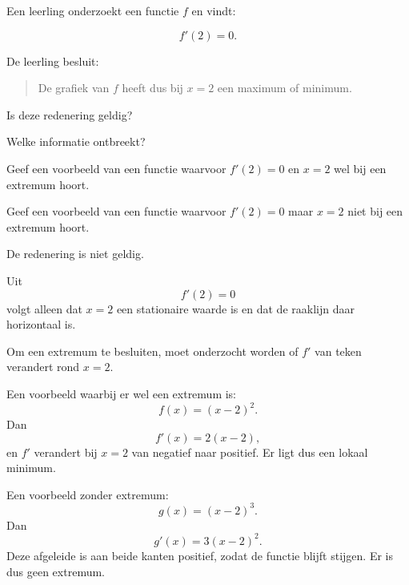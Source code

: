 \documentclass{ximera}
\begin{document}
\begin{oefening}{\oefU\ESS}

Een leerling onderzoekt een functie $f$ en vindt:

\[
f'(2)=0.
\]

De leerling besluit:

\begin{quote}
De grafiek van $f$ heeft dus bij $x=2$ een maximum of minimum.
\end{quote}

\begin{question}
Is deze redenering geldig?
\end{question}

\begin{question}
Welke informatie ontbreekt?
\end{question}

\begin{question}
Geef een voorbeeld van een functie waarvoor $f'(2)=0$
en $x=2$ wel bij een extremum hoort.
\end{question}

\begin{question}
Geef een voorbeeld van een functie waarvoor $f'(2)=0$
maar $x=2$ niet bij een extremum hoort.
\end{question}

\begin{oplossing}

De redenering is niet geldig.

Uit
\[
f'(2)=0
\]
volgt alleen dat $x=2$ een stationaire waarde is en dat de raaklijn daar
horizontaal is.

Om een extremum te besluiten, moet onderzocht worden of $f'$ van teken
verandert rond $x=2$.

Een voorbeeld waarbij er wel een extremum is:
\[
f(x)=(x-2)^2.
\]
Dan
\[
f'(x)=2(x-2),
\]
en $f'$ verandert bij $x=2$ van negatief naar positief. Er ligt dus een
lokaal minimum.

Een voorbeeld zonder extremum:
\[
g(x)=(x-2)^3.
\]
Dan
\[
g'(x)=3(x-2)^2.
\]
Deze afgeleide is aan beide kanten positief, zodat de functie blijft
stijgen. Er is dus geen extremum.

\end{oplossing}

\end{oefening}


\end{document}
